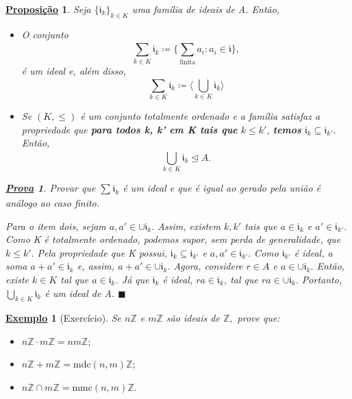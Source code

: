 \documentclass{article}
\newtheorem*{prop*}{\underline{Proposi\c c\~ao}}
\newtheorem{example}{\underline{Exemplo}}
\newtheorem*{proof*}{\underline{Prova}}
\renewcommand\qedsymbol{$\blacksquare$}
\begin{document}
\begin{prop*}
  Seja \(\{\mathfrak{i}_{k}\}_{k\in K}\) uma família de ideais de A. Então,
  \begin{itemize}
    \item[1)] O conjunto 
      \[
        \sum\limits_{k\in K}^{}\mathfrak{i}_{k}\coloneqq \biggl\{\sum\limits_{\text{finita}}^{}a_{i}: a_{i}\in \mathfrak{i}\biggr\},
      \]
      é um ideal e, além disso, 
      \[
        \sum\limits_{k\in K}^{}\mathfrak{i}_{k}\coloneqq \biggl\langle \bigcup_{k\in K}^{}{\mathfrak{i}_{k}} \biggr\rangle
      \]
    \item[2)] Se \((K,\leq )\) é um conjunto totalmente ordenado e a família satisfaz a propriedade que
      \textbf{para todos k, k' em K tais que} \(k\leq k'\), \textbf{temos} \(\mathfrak{i}_{k}\subseteq{\mathfrak{i}_{k'}}\). Então, 
      \[
        \bigcup_{k\in K}^{}{\mathfrak{i}_{k}}\trianglelefteq{A}.
      \]
  \end{itemize}
  \begin{proof*}
    Provar que \(\sum\limits_{}^{}\mathfrak{i}_{k}\) é um ideal e que é igual ao gerado pela união é análogo ao caso finito.

    Para o item dois, sejam \(a, a'\in \cup \mathfrak{i}_{k}.\) Assim, existem \(k, k'\) tais que \(a\in \mathfrak{i}_{k}\) e \(a'\in \mathfrak{i}_{k'}\).
    Como K é totalmente ordenado, podemos supor, sem perda de generalidade, que \(k\leq k'.\) Pela propriedade que K possui,
    \(\mathfrak{i}_{k}\subseteq{\mathfrak{i}_{k'}}\) e \(a, a'\in \mathfrak{i}_{k'}.\) Como \(\mathfrak{i}_{k'}\) é ideal, a soma
    \(a + a'\in \mathfrak{i}_{k}\) e, assim, \(a + a'\in\cup \mathfrak{i}_{k}.\) Agora, considere \(r\in A\)
    e \(a\in \cup \mathfrak{i}_{k}.\) Então, existe \(k\in K\) tal que \(a\in \mathfrak{i}_{k}\). Já que \(\mathfrak{i}_{k}\)
    é ideal, \(ra\in \mathfrak{i}_{k}\), tal que \(ra\in \cup \mathfrak{i}_{k}.\) Portanto, \(\bigcup_{k\in K}^{}{\mathfrak{i}_{k}}\) é um
    ideal de A. \qedsymbol
  \end{proof*}
\end{prop*}
\begin{example}[Exercício]
  Se \(n \mathbb{Z}\) e \(m \mathbb{Z}\) são ideais de \(\mathbb{Z},\) prove que:
  \begin{itemize}
    \item[1)] \(n \mathbb{Z}\cdot m \mathbb{Z} = nm \mathbb{Z};\)
    \item[2)] \(n \mathbb{Z} + m \mathbb{Z} = \mathrm{mdc}(n, m) \mathbb{Z};\)
    \item[3)] \(n \mathbb{Z}\cap m \mathbb{Z} = \mathrm{mmc}(n, m) \mathbb{Z}.\)
  \end{itemize}
\end{example}
\end{document}
